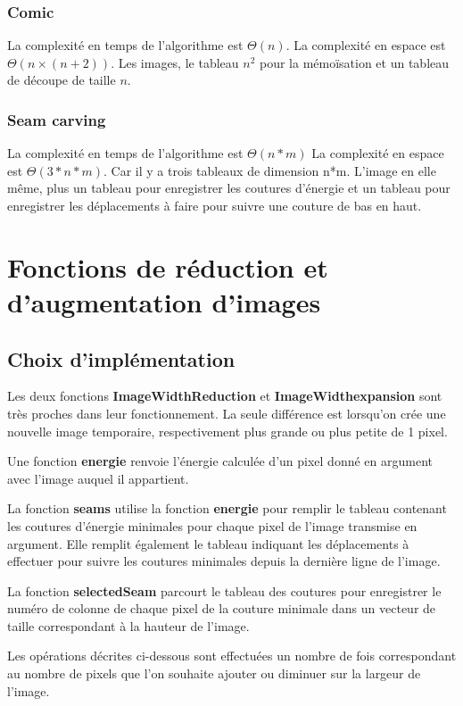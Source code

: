 \documentclass[10pt]{article}
\begin{document}
\subsubsection{Comic}
La complexité en temps de l'algorithme est $\Theta(n)$.
La complexité en espace est $\Theta(n \times (n+2))$. Les images, le tableau $n^2$ pour la mémoïsation et un tableau de découpe de taille $n$.
\subsubsection{Seam carving}
La complexité en temps de l'algorithme est $\Theta(n*m)$
La complexité en espace est $\Theta(3*n*m)$. Car il y a trois tableaux de dimension n*m. L'image en elle même, plus un tableau pour enregistrer les coutures d'énergie et un tableau pour enregistrer les déplacements à faire pour suivre une couture de bas en haut.

\section{Fonctions de réduction et d'augmentation d'images}
\subsection{Choix d'implémentation}
Les deux fonctions \textbf{ImageWidthReduction} et \textbf{ImageWidthexpansion} sont très proches dans leur fonctionnement. La seule différence est lorsqu'on crée une nouvelle image temporaire, respectivement plus grande ou plus petite de 1 pixel.

Une fonction \textbf{energie} renvoie l'énergie calculée d'un pixel donné en argument avec l'image auquel il appartient.

La fonction \textbf{seams} utilise la fonction \textbf{energie} pour remplir le tableau contenant les coutures d'énergie minimales pour chaque pixel de l'image transmise en argument. Elle remplit également le tableau indiquant les déplacements à effectuer pour suivre les coutures minimales depuis la dernière ligne de l'image.

La fonction \textbf{selectedSeam} parcourt le tableau  des coutures pour enregistrer le numéro de colonne de chaque pixel de la couture minimale dans un vecteur de taille correspondant à la hauteur de l'image. 

Les opérations décrites ci-dessous sont effectuées un nombre de fois correspondant au nombre de pixels que l'on souhaite ajouter ou diminuer sur la largeur de l'image.
\end{document}
